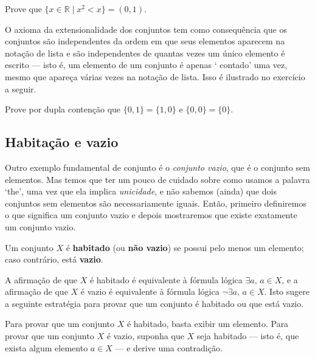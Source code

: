 \begin{exercise}
Prove que $\{ x \in \mathbb{R} \mid x^2 < x \} = (0,1)$.
\end{exercise}

O axioma da extensionalidade dos conjuntos tem como consequência que os conjuntos são independentes da ordem em que seus elementos aparecem na notação de lista e são independentes de quantas vezes um único elemento é escrito --- isto é, um elemento de um conjunto é apenas ` contado' uma vez, mesmo que apareça várias vezes na notação de lista. Isso é ilustrado no exercício a seguir.

\begin{exercise}
Prove por dupla contenção que $\{ 0, 1 \} = \{ 1, 0 \}$ e $\{ 0, 0 \} = \{ 0 \}$.
\end{exercise}

\subsection*{Habitação e vazio}

Outro exemplo fundamental de conjunto é o \textit{conjunto vazio}, que é o conjunto sem elementos. Mas temos que ter um pouco de cuidado sobre como usamos a palavra `the', uma vez que ela implica \textit{unicidade}, e não sabemos (ainda) que dois conjuntos sem elementos são necessariamente iguais. Então, primeiro definiremos o que significa um conjunto vazio e depois mostraremos que existe exatamente um conjunto vazio.

\begin{definition}
\label{defInhabited}
\label{defEmptyProperty}
Um conjunto $X$ é \textbf{habitado} (ou \textbf{não vazio}) se possui pelo menos um elemento; caso contrário, está \textbf{vazio}.
\end{definition}

A afirmação de que $X$ é habitado é equivalente à fórmula lógica $\exists a,\, a \in X$, e a afirmação de que $X$ é vazio é equivalente à fórmula lógica $\neg \exists a,\, a \in X$. Isto sugere a seguinte estratégia para provar que um conjunto é habitado ou que está vazio.

\begin{strategy}
Para provar que um conjunto $X$ é habitado, basta exibir um elemento. Para provar que um conjunto $X$ é vazio, suponha que $X$ seja habitado --- isto é, que exista algum elemento $a \in X$ --- e derive uma contradição.
\end{strategy}

